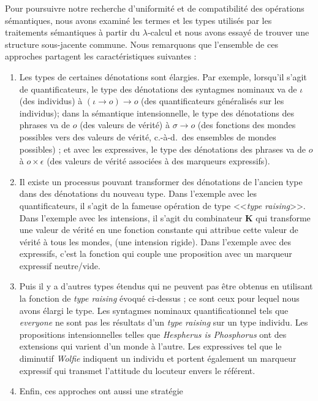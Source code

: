 Pour poursuivre notre recherche d'uniformité et de compatibilité des opérations
sémantiques, nous avons examiné les termes et les types utilisés par les
traitements sémantiques à partir du $\lambda$-calcul et nous avons essayé de trouver
une structure sous-jacente commune. Nous remarquons que l'ensemble de ces 
approches partagent les caractéristiques suivantes :

\begin{enumerate}
\item \label{item:french-type-transformation} Les types de certaines 
  dénotations sont élargies. Par exemple, lorsqu'il s'agit de quantificateurs,
  le type des dénotations des syntagmes nominaux va de $\iota$ (des individus) à
  $(\iota \to o) \to o$ (des quantificateurs généralisés sur les individus);
  dans la sémantique intensionnelle, le type des dénotations des phrases va de $o$
  (des valeurs de vérité) à $\sigma \to o$ (des fonctions des mondes possibles
  vers des valeurs de vérité, c.-à-d.\ des ensembles de mondes possibles) ; et
  avec les expressives, le type des dénotations des phrases va de $o$ à $o \times
  \epsilon$ (des valeurs de vérité associées à des marqueurs expressifs).
\item \label{item:french-monad-eta} Il existe un processus pouvant transformer des
  dénotations de l'ancien type dans des dénotations du nouveau type. Dans
  l'exemple avec les quantificateurs, il s'agit de la fameuse opération de type 
  <<\textit{type raising}>>. Dans l'exemple avec les intensions,
  il s'agit du combinateur $\textbf{K}$ qui transforme une valeur de vérité en
  une fonction constante qui attribue cette valeur de vérité à tous les mondes,
  (une intension rigide). Dans l'exemple avec des expressifs, c'est la fonction
  qui couple une proposition avec un marqueur expressif neutre/vide.
\item Puis il y a d'autres types étendus qui ne peuvent pas être
  obtenus en utilisant la fonction de \textit{type raising} évoqué ci-dessus ; ce sont ceux pour
  lequel nous avons élargi le type. Les syntagmes nominaux quantificationnel
  tels que \emph{everyone} ne sont pas les résultats d'un \textit{type raising} sur un type 
  individu. Les propositions intensionnelles telles que \emph{Hespherus is
    Phosphorus} ont des extensions qui varient d'un monde à l'autre. Les
  expressives tel que le diminutif \emph{Wolfie} indiquent un individu et
  portent également un marqueur expressif qui transmet l'attitude du locuteur
  envers le référent.
\item \label{item:french-monad-mu} Enfin, ces approches ont aussi une stratégie 

\end{enumerate}
